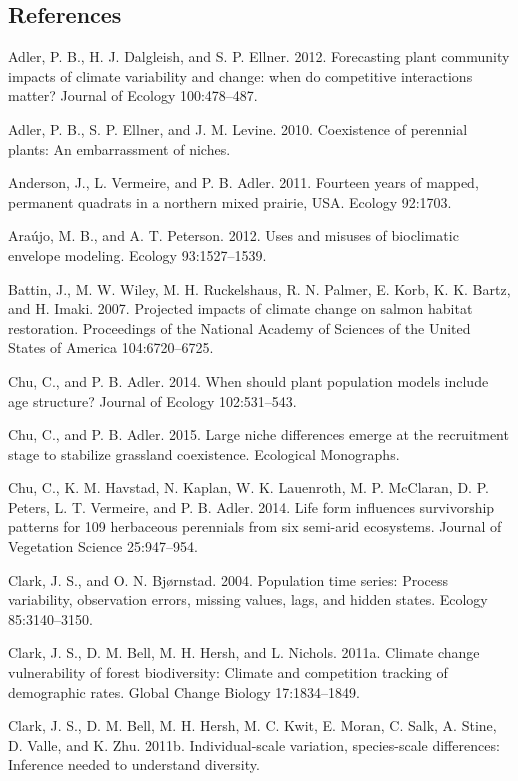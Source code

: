 \documentclass[12pt,]{article}
\begin{document}
\pagebreak{}

\setcounter{page}{24}

\subsection*{References}\label{references}

Adler, P. B., H. J. Dalgleish, and S. P. Ellner. 2012. Forecasting plant
community impacts of climate variability and change: when do competitive
interactions matter? Journal of Ecology 100:478--487.

Adler, P. B., S. P. Ellner, and J. M. Levine. 2010. Coexistence of
perennial plants: An embarrassment of niches.

Anderson, J., L. Vermeire, and P. B. Adler. 2011. Fourteen years of
mapped, permanent quadrats in a northern mixed prairie, USA. Ecology
92:1703.

Araújo, M. B., and A. T. Peterson. 2012. Uses and misuses of bioclimatic
envelope modeling. Ecology 93:1527--1539.

Battin, J., M. W. Wiley, M. H. Ruckelshaus, R. N. Palmer, E. Korb, K. K.
Bartz, and H. Imaki. 2007. Projected impacts of climate change on salmon
habitat restoration. Proceedings of the National Academy of Sciences of
the United States of America 104:6720--6725.

Chu, C., and P. B. Adler. 2014. When should plant population models
include age structure? Journal of Ecology 102:531--543.

Chu, C., and P. B. Adler. 2015. Large niche differences emerge at the
recruitment stage to stabilize grassland coexistence. Ecological
Monographs.

Chu, C., K. M. Havstad, N. Kaplan, W. K. Lauenroth, M. P. McClaran, D.
P. Peters, L. T. Vermeire, and P. B. Adler. 2014. Life form influences
survivorship patterns for 109 herbaceous perennials from six semi-arid
ecosystems. Journal of Vegetation Science 25:947--954.

Clark, J. S., and O. N. Bjørnstad. 2004. Population time series: Process
variability, observation errors, missing values, lags, and hidden
states. Ecology 85:3140--3150.

Clark, J. S., D. M. Bell, M. H. Hersh, and L. Nichols. 2011a. Climate
change vulnerability of forest biodiversity: Climate and competition
tracking of demographic rates. Global Change Biology 17:1834--1849.

Clark, J. S., D. M. Bell, M. H. Hersh, M. C. Kwit, E. Moran, C. Salk, A.
Stine, D. Valle, and K. Zhu. 2011b. Individual-scale variation,
species-scale differences: Inference needed to understand diversity.
\end{document}
